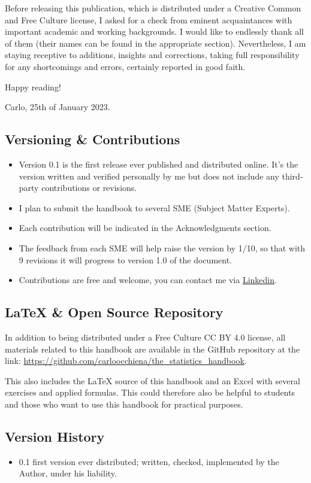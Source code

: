 \documentclass{article}
\begin{document}
Before releasing this publication, which is distributed under a Creative Common and Free Culture license, I asked for a check from eminent acquaintances with important academic and working backgrounds. I would like to endlessly thank all of them (their names can be found in the appropriate section). Nevertheless, I am staying receptive to additions, insights and corrections, taking full responsibility for any shortcomings and errors, certainly reported in good faith.

Happy reading! 

Carlo, 25th of January 2023.

\subsection{Versioning \& Contributions}
\begin{itemize}
    \item Version 0.1 is the first release ever published and distributed online. It's the version written and verified personally by me but does not include any third-party contributions or revisions. 
    \item I plan to submit the handbook to several SME (Subject Matter Experts). 
    \item Each contribution will be indicated in the Acknowledgments section. 
    \item The feedback from each SME will help raise the version by 1/10, so that with 9 revisions it will progress to version 1.0 of the document.
    \item Contributions are free and welcome, you can contact me via \href{https://www.linkedin.com/in/carloocchiena/}{Linkedin}. 
\end{itemize}


\subsection{\LaTeX{} \& Open Source Repository}
In addition to being distributed under a Free Culture CC BY 4.0 license, all materials related to this handbook are available in the GitHub repository at the link: \url{https://github.com/carloocchiena/the_statistics_handbook}.

This also includes the \LaTeX{} source of this handbook and an Excel with several exercises and applied formulas. This could therefore also be helpful to students and those who want to use this handbook for practical purposes. 

\subsection{Version History}
\begin{itemize}
    \item 0.1 first version ever distributed; written, checked, implemented by the Author, under his liability.
\end{itemize}
\end{document}
